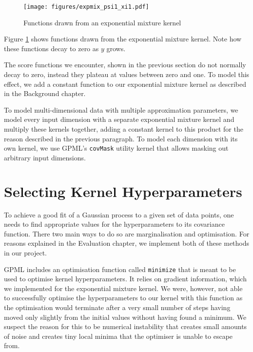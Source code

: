 \documentclass[a4paper,12pt,twoside,openright]{report}
\begin{document}
\begin{figure}
\centering

  \centering
  \texttt{[image: figures/expmix\_psi1\_xi1.pdf]}
  \caption{Functions drawn from an exponential mixture kernel}
  \label{expmix11}
\end{figure}

Figure \ref{expmix11} shows functions drawn from the exponential mixture kernel. Note how these functions decay to zero as $y$ grows.

The score functions we encounter, shown in the previous section do not normally decay to zero, instead they plateau at values between zero and one. To model this effect, we add a constant function to our exponential mixture kernel as described in the Background chapter.

To model multi-dimensional data with multiple approximation parameters, we model every input dimension with a separate exponential mixture kernel and multiply these kernels together, adding a constant kernel to this product for the reason described in the previous paragraph. To model each dimension with its own kernel, we use GPML's \texttt{covMask} utility kernel that allows masking out arbitrary input dimensions.

\section{Selecting Kernel Hyperparameters} 


To achieve a good fit of a Gaussian process to a given set of data points, one needs to find appropriate values for the hyperparameters to its covariance function. There two main ways to do so are marginalisation and optimisation. For reasons explained in the Evaluation chapter, we implement both of these methods in our project.

GPML includes an optimisation function called \texttt{minimize} that is meant to be used to optimise kernel hyperparameters. It relies on gradient information, which we implemented for the exponential mixture kernel. We were, however, not able to successfully optimise the hyperparameters to our kernel with this function as the optimisation would terminate after a very small number of steps having moved only slightly from the initial values without having found a minimum. We suspect the reason for this to be numerical instability that creates small amounts of noise and creates tiny local minima that the optimiser is unable to escape from. 
\end{document}

